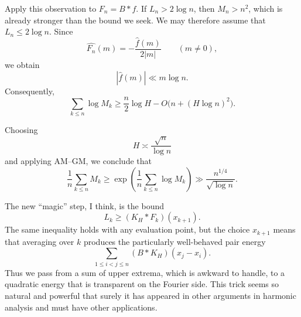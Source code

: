 \documentclass[11pt]{article}
\begin{document}
Apply this observation to $F_n=B*f$. If $L_n>2\log n$, then
$M_n>n^2$, which is already stronger than the bound we seek. We may
therefore assume that $L_n\leq 2\log n$. Since
\[
  \widehat{F_n}(m)
  =
  -\frac{\widehat{f}(m)}{2|m|}
  \qquad (m\neq 0),
\]
we obtain
\[
  |\widehat{f}(m)|\ll m\log n.
\]
Consequently,
\[
  \sum_{k\leq n}\log M_k
  \geq
  \frac{n}{2}\log H
  -
  O\bigl(n+(H\log n)^2\bigr).
\]

Choosing
\[
  H\asymp \frac{\sqrt{n}}{\log n}
\]
and applying AM--GM, we conclude that
\[
  \frac{1}{n}\sum_{k\leq n}M_k
  \geq
  \exp\left(\frac{1}{n}\sum_{k\leq n}\log M_k\right)
  \gg
  \frac{n^{1/4}}{\sqrt{\log n}}.
\]

The new ``magic'' step, I think, is the bound
\[
  L_k\geq (K_H*F_k)(x_{k+1}).
\]
The same inequality holds with any evaluation point, but the choice
$x_{k+1}$ means that averaging over $k$ produces the particularly
well-behaved pair energy
\[
  \sum_{1\leq i<j\leq n}(B*K_H)(x_j-x_i).
\]
Thus we pass from a sum of upper extrema, which is awkward to handle, to a
quadratic energy that is transparent on the Fourier side. This trick seems so
natural and powerful that surely it has appeared in other arguments in
harmonic analysis and must have other applications.
\end{document}
